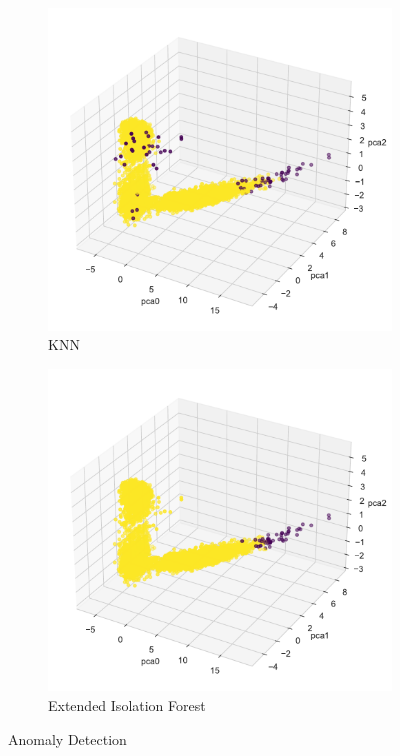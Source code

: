 \documentclass[10pt, a4paper, twocolumn]{article}
\begin{document}
\begin{figure}
\addtocounter{subfigure}{-3}  
  \begin{subfigure}[t]{0.49\columnwidth}
    \includegraphics[width=\linewidth]{immagini Lia/KNN_anomaly_detection.pdf}
    \caption{KNN}
    \label{fig:KNN}
  \end{subfigure}
 \hfill %
\addtocounter{subfigure}{2}
  \begin{subfigure}[t]{0.49\columnwidth}
    \includegraphics[width=\linewidth]{immagini Lia/EX_Iso_anomaly_detection.pdf}
    \caption{Extended Isolation Forest}
    \label{fig:exiso}
  \end{subfigure}
  
  \caption{Anomaly Detection}
  \label{fig:anomaly}
\end{figure}
\end{document}
